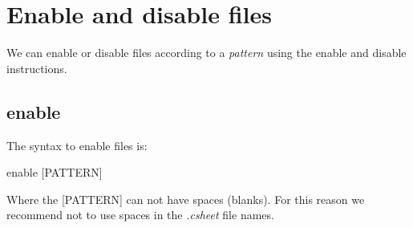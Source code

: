 \documentclass[11pt,a4paper,openright,oneside]{book}
\begin{document}
\section{Enable and disable files}

We can enable or disable files according to a \textit{pattern} using the \textsf{enable} and \textsf{disable} instructions.

\subsection{\textsf{enable}} \label{enableInstruction}

The syntax to enable files is:
\begin{center} \textsf{enable \textsc{\scriptsize [PATTERN]}} \end{center}

Where the \textsc{\scriptsize[PATTERN]} can not have spaces (blanks). For this reason we recommend not to use spaces in the \textit{.csheet} file names.
\end{document}
